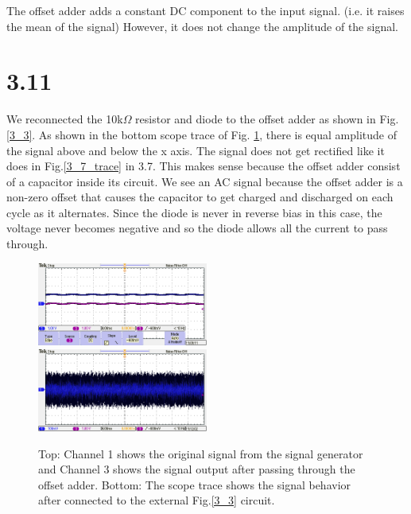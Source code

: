 \documentclass[authoryear, 12pt,5p, times]{elsarticle}
\begin{document}
The offset adder adds a constant DC component to the input signal. (i.e. it raises the mean of the signal) However, it does not change the amplitude of the signal.
 
\section*{3.11}
We reconnected the 10k$\Omega$ resistor and diode to the offset adder as shown in  Fig.\ref{3_3}. As shown in the bottom scope trace of Fig. \ref{3_11}, there is equal amplitude of the signal above and below the x axis. The signal does not get rectified like it does in Fig.\ref{3_7_trace} in 3.7.  This makes sense because the offset adder consist of a capacitor inside its circuit. We see an AC signal because the offset adder is a non-zero offset that causes the capacitor to get charged and discharged on each cycle as it alternates. Since the diode is never in reverse bias in this case, the voltage never becomes negative and so the diode allows all the current to pass through. 
\begin{figure}[h!]
\center
\includegraphics[width=0.5\textwidth]{figure/TEK00022}
\includegraphics[width=0.5\textwidth]{figure/TEK00024}
\caption{Top: Channel 1 shows the original signal from the signal generator and Channel 3 shows the signal output after passing through the offset adder. Bottom: The scope trace shows the signal behavior after connected to the external Fig.\ref{3_3} circuit.}
\label{3_11}
\end{figure}
\end{document}
